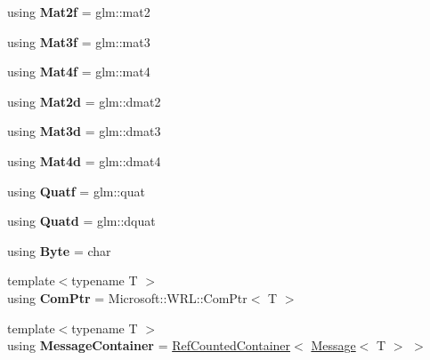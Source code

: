 \begin{DoxyCompactItemize}
\mbox{\label{namespace_blade_a7fd0ae5d82a36d286da3e062f8c8941a}} 
using {\bfseries Mat2f} = glm\+::mat2
\item 
\mbox{\label{namespace_blade_a42f7e034256aedd1110cfe2d2165a188}} 
using {\bfseries Mat3f} = glm\+::mat3
\item 
\mbox{\label{namespace_blade_ad711e51454d4570f165ca72429d92f9a}} 
using {\bfseries Mat4f} = glm\+::mat4
\item 
\mbox{\label{namespace_blade_a9f00dffbe4f33320cded379b320228fc}} 
using {\bfseries Mat2d} = glm\+::dmat2
\item 
\mbox{\label{namespace_blade_a1192c68d88f27d03e993e3ee7bd5af4e}} 
using {\bfseries Mat3d} = glm\+::dmat3
\item 
\mbox{\label{namespace_blade_a99e46b563274d5f4bea994942f29f90f}} 
using {\bfseries Mat4d} = glm\+::dmat4
\item 
\mbox{\label{namespace_blade_a5df88491ae781e679c890c34c8a1bdc1}} 
using {\bfseries Quatf} = glm\+::quat
\item 
\mbox{\label{namespace_blade_a58fd1bca8f1f85c9ca07a47b41362b09}} 
using {\bfseries Quatd} = glm\+::dquat
\item 
\mbox{\label{namespace_blade_a9e8100907306b181e4c5c4821f05c067}} 
using {\bfseries Byte} = char
\item 
\mbox{\label{namespace_blade_a3d1bb4758937d77ae011538f5fdcc424}} 
{\footnotesize template$<$typename T $>$ }\\using {\bfseries Com\+Ptr} = Microsoft\+::\+W\+R\+L\+::\+Com\+Ptr$<$ T $>$
\item 
\mbox{\label{namespace_blade_a5a92f99b749a1913c801787c37d2dfe6}} 
{\footnotesize template$<$typename T $>$ }\\using {\bfseries Message\+Container} = \hyperlink{class_blade_1_1_ref_counted_container}{Ref\+Counted\+Container}$<$ \hyperlink{class_blade_1_1_message}{Message}$<$ T $>$ $>$

\end{DoxyCompactItemize}
